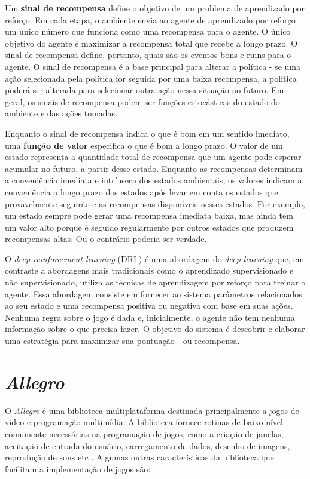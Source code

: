  Um \textbf{sinal de recompensa} define o objetivo de um problema de aprendizado por reforço. 
 Em cada etapa, o ambiente envia ao agente de aprendizado por reforço um único número que funciona como uma recompensa para o agente. 
 O único objetivo do agente é maximizar a recompensa total que recebe a longo prazo.
 O sinal de recompensa define, portanto, quais são os eventos bons e ruins para o agente. 
 O sinal de recompensa é a base principal para alterar a política - se uma ação selecionada pela política for seguida por uma baixa recompensa, a política poderá ser alterada para selecionar outra ação nessa situação no futuro. 
 Em geral, os sinais de recompensa podem ser funções estocásticas do estado do ambiente e das ações tomadas.

 Enquanto o sinal de recompensa indica o que é bom em um sentido imediato, uma \textbf{função de valor} especifica o que é bom a longo prazo. 
 O valor de um estado representa a quantidade total de recompensa que um agente pode esperar acumular no futuro, a partir desse estado. 
 Enquanto as recompensas determinam a conveniência imediata e intrínseca dos estados ambientais, os valores indicam a conveniência a longo prazo dos estados após levar em conta os estados que provavelmente seguirão e as recompensas disponíveis nesses estados. 
 Por exemplo, um estado sempre pode gerar uma recompensa imediata baixa, mas ainda tem um valor alto porque é seguido regularmente por outros estados que produzem recompensas altas. Ou o contrário poderia ser verdade. 


 O \textit{deep reinforcement learning} (DRL) é uma abordagem do \textit{deep learning} que, em contraste a abordagens mais tradicionais como o aprendizado supervisionado e não supervisionado, utiliza as técnicas de aprendizagem por reforço para treinar o agente. Essa abordagem consiste em fornecer ao sistema parâmetros relacionados ao seu estado e uma recompensa positiva ou negativa com base em suas ações. Nenhuma regra sobre o jogo é dada e, inicialmente, o agente não tem nenhuma informação sobre o que precisa fazer. O objetivo do sistema é descobrir e elaborar uma estratégia para maximizar sua pontuação - ou recompensa.


 \section{\textit{Allegro}}

O \textit{Allegro} é uma biblioteca multiplataforma destinada principalmente a jogos de vídeo e programação multimídia. A biblioteca fornece rotinas de baixo nível comumente necessárias na programação de jogos, como a criação de janelas, aceitação de entrada do usuário, carregamento de dados, desenho de imagens, reprodução de sons etc \cite{allegro}. Algumas outras características da biblioteca que facilitam a implementação de jogos são:

